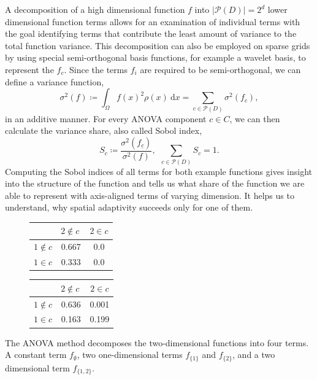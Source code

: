 \documentclass[
  a4paper,  %
  twoside,  %
  bibliography=totoc,
  headsepline,
  cleardoublepage=empty,
  parskip=half,
  draft=false
]{scrbook}
\begin{document}
A decomposition of a high dimensional function $f$ into $|\mathcal{P}(D)|=2^d$ lower dimensional function terms allows for an examination of individual terms with the goal identifying terms that contribute the least amount of variance to the total function variance.
This decomposition can also be employed on sparse grids \cite{F10} by using special semi-orthogonal basis functions, for example a wavelet basis, to represent the $f_c$.
Since the terms $f_i$ are required to be semi-orthogonal, we can define a variance function,
\begin{equation}
\sigma^2(f) \coloneqq \int_{\Omega} f(x)^2 \rho(x) ~ \text{d} x=\sum_{c \in \mathcal{P}(D)} \sigma^2(f_c),
\end{equation}
in an additive manner.
For every ANOVA component $c \in C$, we can then calculate the variance share, also called Sobol index,
\begin{equation}
S_{c} \coloneqq \frac{\sigma^2(f_{\underline{c}} )}{\sigma^2(f)}, ~~ \sum_{c \in \mathcal{P}(D)} S_{c} = 1.
\end{equation}
Computing the Sobol indices of all terms for both example functions gives insight into the structure of the function and tells us what share of the function we are able to represent with axis-aligned terms of varying dimension.
It helps us to understand, why spatial adaptivity succeeds only for one of them.

\begin{mdframed}[style=style]
\begin{figure}[H]
        \centering
\begin{minipage}[H]{.45\textwidth}
  \centering
  \begin{tabular}{ l c c }
\hline \hline
& $2 \notin c~$ & $2 \in c$ \\
\hline
$1 \notin c$ & 0.667 & 0.0\\
$1 \in c$ & 0.333 & 0.0\\
\end{tabular}
\delimit
  \label{tab:anova_f1}
    \end{minipage}%
    \hspace{.05\textwidth}
    \begin{minipage}[H]{0.45\textwidth}
  \centering
  \begin{tabular}{ l c c }
\hline \hline
& $2 \notin c~$ & $2 \in c$ \\
\hline
$1 \notin c$ & 0.636 & 0.001\\
$1 \in c$ & 0.163 & 0.199\\
\end{tabular}
\delimit
  \label{tab:anova_f2}
    \end{minipage}
\end{figure}
\end{mdframed}
%
The ANOVA method decomposes the two-dimensional functions into four terms.
A constant term $f_\emptyset$, two one-dimensional terms $f_{\{1\}}$ and $f_{\{2\}}$, and a two dimensional term $f_{\{1,2\}}$.
\end{document}
